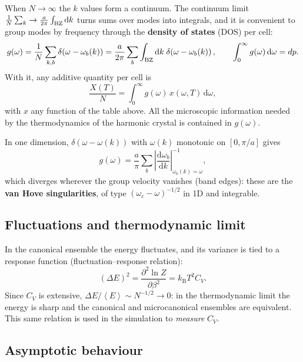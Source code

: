 \documentclass[11pt,a4paper]{article}
\newcommand{\kB}{k_{\mathrm B}}
\newcommand{\dd}{\mathrm{d}}
\newcommand{\avg}[1]{\left\langle #1\right\rangle}
\begin{document}
When $N\to\infty$ the $k$ values form a continuum. The continuum limit
$\frac1N\sum_k\to\frac{a}{2\pi}\int_{\rm BZ}\dd k$ turns sums over modes into
integrals, and it is convenient to group modes by frequency through the
\textbf{density of states} (DOS) per cell:
\begin{equation}
g(\omega)=\frac1N\sum_{k,b}\delta\!\left(\omega-\omega_b(k)\right)
=\frac{a}{2\pi}\sum_b\int_{\rm BZ}\dd k\;\delta\!\left(\omega-\omega_b(k)\right),
\qquad \int_0^\infty g(\omega)\,\dd\omega = dp .
\end{equation}
With it, any additive quantity per cell is
\begin{equation}
\frac{X(T)}{N}=\int_0^\infty g(\omega)\,x(\omega,T)\,\dd\omega ,
\label{eq:dosint}
\end{equation}
with $x$ any function of the table above. All the microscopic information needed
by the thermodynamics of the harmonic crystal is contained in $g(\omega)$.

In one dimension, $\delta(\omega-\omega(k))$ with $\omega(k)$ monotonic on
$[0,\pi/a]$ gives
\begin{equation}
g(\omega)=\frac{a}{\pi}\sum_b\left|\frac{\dd\omega_b}{\dd k}\right|^{-1}_{\omega_b(k)=\omega},
\end{equation}
which diverges wherever the group velocity vanishes (band edges): these are the
\textbf{van Hove singularities}, of type $(\omega_c-\omega)^{-1/2}$ in 1D and
integrable.

\subsection{Fluctuations and thermodynamic limit}\label{sec:fluct}

In the canonical ensemble the energy fluctuates, and its variance is tied to a
response function (fluctuation–response relation):
\begin{equation}
(\Delta E)^2=\frac{\partial^2\ln Z}{\partial\beta^2}=\kB T^2C_V .
\end{equation}
Since $C_V$ is extensive, $\Delta E/\avg E\sim N^{-1/2}\to0$: in the
thermodynamic limit the energy is sharp and the canonical and microcanonical
ensembles are equivalent. This same relation is used in the simulation to
\emph{measure} $C_V$.

\subsection{Asymptotic behaviour}
\end{document}
